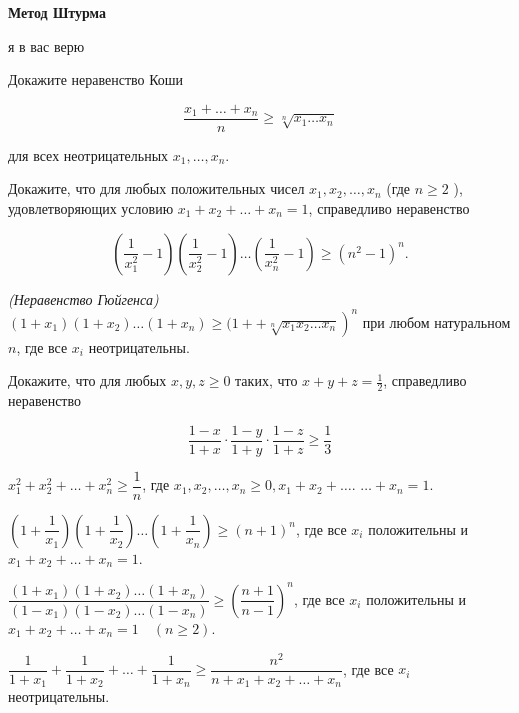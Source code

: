 \centerline{\bf \Huge Метод Штурма}

\begin{flushright}
        \scriptsize{я в вас верю}
\end{flushright}

Докажите неравенство Коши

$$
\dfrac{x_1+\ldots+x_n}{n} \geq \sqrt[n]{x_1 \ldots x_n}
$$


для всех неотрицательных $x_1, \ldots, x_n$.

Докажите, что для любых положительных чисел $x_1, x_2, \ldots, x_n$ (где $n \geq 2$ ), удовлетворяющих условию $x_1+x_2+\ldots+x_n=1$, справедливо неравенство

$$
\left(\dfrac{1}{x_1^2}-1\right)\left(\dfrac{1}{x_2^2}-1\right) \ldots\left(\dfrac{1}{x_n^2}-1\right) \geq\left(n^2-1\right)^n .
$$

\textit{(Неравенство Гюйгенса)} $\left(1+x_1\right)\left(1+x_2\right) \ldots\left(1+x_n\right) \geq(1+ \left.+\sqrt[n]{x_1 x_2 \ldots x_n}\right)^n$ при любом натуральном $n$, где все $x_i$ неотрицательны.

Докажите, что для любых $x, y, z \geq 0$ таких, что $x+y+z=\frac{1}{2}$, справедливо неравенство

$$
\frac{1-x}{1+x} \cdot \frac{1-y}{1+y} \cdot \frac{1-z}{1+z} \geq \frac{1}{3}
$$

 $x_1^2+x_2^2+\ldots+x_n^2 \geq \dfrac{1}{n}$, где $x_1, x_2, \ldots, x_n \geq 0, x_1+x_2+\ldots$. $\ldots+x_n=1$.

$\left(1+\dfrac{1}{x_1}\right)\left(1+\dfrac{1}{x_2}\right) \ldots\left(1+\dfrac{1}{x_n}\right) \geq(n+1)^n$, где все $x_i$ положительны и $x_1+x_2+\ldots+x_n=1$.

$\dfrac{\left(1+x_1\right)\left(1+x_2\right) \ldots\left(1+x_n\right)}{\left(1-x_1\right)\left(1-x_2\right) \ldots\left(1-x_n\right)} \geq\left(\dfrac{n+1}{n-1}\right)^n$, где все $x_i$ положительны и $x_1+x_2+\ldots+x_n=1 \quad(n \geq 2)$.

$\dfrac{1}{1+x_1}+\dfrac{1}{1+x_2}+\ldots+\dfrac{1}{1+x_n} \geq \dfrac{n^2}{n+x_1+x_2+\ldots+x_n}$,  где все $x_i$ неотрицательны.